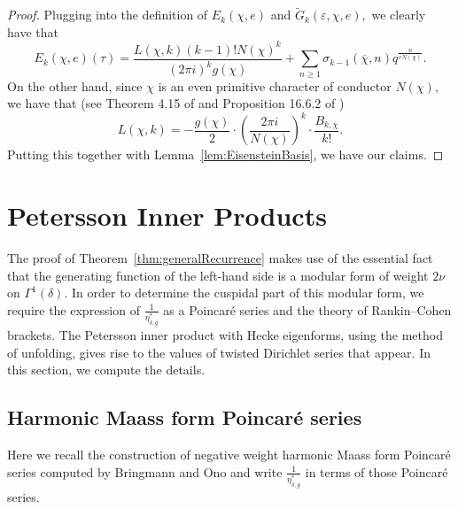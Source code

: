 \documentclass[10pt]{amsart}
\theoremstyle{definition}
\theoremstyle{remark}
\numberwithin{equation}{section}
\begin{document}
	\begin{proof}
		Plugging into the definition of $E_k(\chi,e)$ and $\tilde{G}_k(\varepsilon,\chi,e),$ we clearly have that
		$$
		E_k(\chi,e)(\tau) = \frac{L(\chi,k)(k-1)!N(\chi)^k}{(2\pi i)^kg(\chi)} +  \sum\limits_{n\geq 1}\sigma_{k-1}(\overline{\chi},n)q^{\frac{n}{eN(\chi)}}.
		$$
		On the other hand, since $\chi$ is an even primitive character of conductor $N(\chi),$ we have that (see Theorem 4.15 of \cite{Kowalski} and Proposition 16.6.2 of \cite{Rosen})
		$$
		L(\chi,k)=-\frac{g(\chi)}{2}\cdot\left(\frac{2\pi i}{N(\chi)}\right)^k\cdot\frac{B_{k,\overline{\chi}}}{k!}.
		$$
		Putting this together with Lemma~\ref{lem:EisensteinBasis}, we have our claims.
	\end{proof}
	
	\section{Petersson Inner Products}\label{sec:PIP}
	
	The proof of Theorem~\ref{thm:generalRecurrence} makes use of the essential fact that the generating function of the left-hand side is a modular form of weight $2\nu$ on $\Gamma^1(\delta).$ In order to determine the cuspidal part of this modular form, we require the expression of $\frac{1}{\eta_{\delta,g}^\ast}$ as a Poincar\'e series and the theory of Rankin--Cohen brackets. The Petersson inner product with Hecke eigenforms, using the method of unfolding, gives rise to the values of twisted Dirichlet series that appear. In this section, we compute the details.
	
	\subsection{Harmonic Maass form Poincar\'e series}
	
	Here we recall the construction of negative weight harmonic Maass form Poincar\'e series computed by Bringmann and Ono \cite{BringmannOno} and write $\frac{1}{\eta_{\delta,g}^\ast}$ in terms of those Poincar\'e series. 
	
\end{document}
